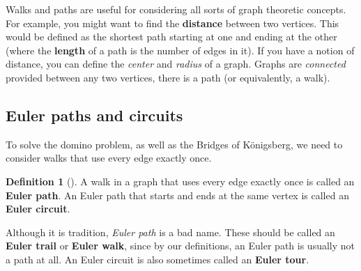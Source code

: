 \documentclass[10pt,]{book}
\newcommand{\terminology}[1]{\textbf{#1}}
\theoremstyle{plain}
\theoremstyle{definition}
\newtheorem{definition}[theorem]{Definition}
\theoremstyle{definition}
\theoremstyle{definition}
\numberwithin{equation}{chapter}
\begin{document}
\par
\hypertarget{p-134}{}%
Walks and paths are useful for considering all sorts of graph theoretic concepts.  For example, you might want to find the \terminology{distance} between two vertices.  This would be defined as the shortest path starting at one and ending at the other (where the \terminology{length} of a path is the number of edges in it).  If you have a notion of distance, you can define the \emph{center} and \emph{radius} of a graph.  Graphs are \emph{connected} provided between any two vertices, there is a path (or equivalently, a walk).%
\typeout{************************************************}
\typeout{************************************************}
\subsection[{Euler paths and circuits}]{Euler paths and circuits}\label{subsec_eulerpaths}
\hypertarget{p-135}{}%
To solve the domino problem, as well as the Bridges of Königsberg, we need to consider walks that use every edge exactly once.%
\begin{definition}[{}]\label{def-eulerpath}
\hypertarget{p-136}{}%
A walk in a graph that uses every edge exactly once is called an \terminology{Euler path}.  An Euler path that starts and ends at the same vertex is called an \terminology{Euler circuit}.%
\end{definition}
\hypertarget{p-137}{}%
Although it is tradition, \emph{Euler path} is a bad name.  These should be called an \terminology{Euler trail} or \terminology{Euler walk}, since by our definitions, an Euler path is usually not a path at all.  An Euler circuit is also sometimes called an \terminology{Euler tour}.%
\end{document}
